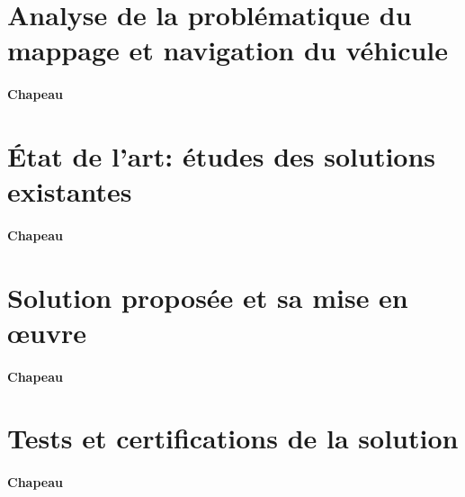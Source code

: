 \section{Analyse de la problématique du mappage et navigation du véhicule} \label{sec:Problematiquemappage}

\paragraph{Chapeau}


\section{État de l’art: études des solutions existantes} \label{sec:etatDeLart1}

\paragraph{Chapeau}


\section{Solution proposée et sa mise en œuvre} \label{sec:solution1}

\paragraph{Chapeau}


\section{Tests et certifications de la solution} \label{sec:test1}

\paragraph{Chapeau}
